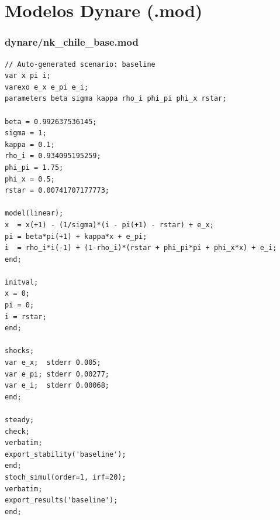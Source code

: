 \documentclass[9pt]{extarticle}
\begin{document}
\part*{Modelos Dynare (.mod)}

\section{dynare/nk\_chile\_base.mod}
\begin{lstlisting}[language={}]
// Auto-generated scenario: baseline
var x pi i;
varexo e_x e_pi e_i;
parameters beta sigma kappa rho_i phi_pi phi_x rstar;

beta = 0.992637536145;
sigma = 1;
kappa = 0.1;
rho_i = 0.934095195259;
phi_pi = 1.75;
phi_x = 0.5;
rstar = 0.00741707177773;

model(linear);
x  = x(+1) - (1/sigma)*(i - pi(+1) - rstar) + e_x;
pi = beta*pi(+1) + kappa*x + e_pi;
i  = rho_i*i(-1) + (1-rho_i)*(rstar + phi_pi*pi + phi_x*x) + e_i;
end;

initval;
x = 0;
pi = 0;
i = rstar;
end;

shocks;
var e_x;  stderr 0.005;
var e_pi; stderr 0.00277;
var e_i;  stderr 0.00068;
end;

steady;
check;
verbatim;
export_stability('baseline');
end;
stoch_simul(order=1, irf=20);
verbatim;
export_results('baseline');
end;
\end{lstlisting}
\clearpage
\end{document}
